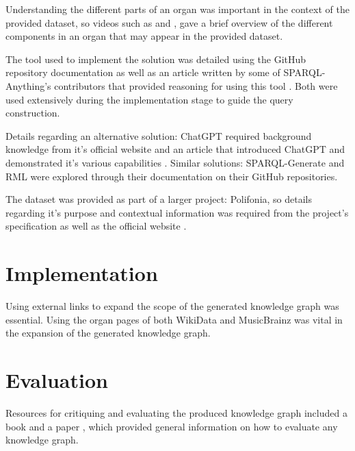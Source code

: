 Understanding the different parts of an organ was important in the context of the provided dataset, so videos such as \cite{organvideo} and \cite{organvideo1}, gave a brief overview of the different components in an organ that may appear in the provided dataset. 

The tool used to implement the solution was detailed using the GitHub repository documentation \cite{sparqlanythinggithub} as well as an article written by some of SPARQL-Anything's contributors that provided reasoning for using this tool \cite{sparqlanything}. Both were used extensively during the implementation stage to guide the query construction. 

Details regarding an alternative solution: ChatGPT required background knowledge from it's official website \cite{chatgptwebsite} and an article that introduced ChatGPT and demonstrated it's various capabilities \cite{chatgpt}. Similar solutions: SPARQL-Generate \cite{sparqlgenerate} and RML \cite{rml} were explored through their documentation on their GitHub repositories.

The dataset was provided as part of a larger project: Polifonia, so details regarding it's purpose and contextual information was required from the project's specification \cite{polifoniaproject} as well as the official website \cite{polifonia}. 

\section{Implementation}
\hspace{0.5cm} Using external links to expand the scope of the generated knowledge graph was essential. Using the organ pages of both WikiData \cite{organwikidata} and MusicBrainz \cite{organmusicbrainz} was vital in the expansion of the generated knowledge graph. 

\section{Evaluation}
\hspace{0.5cm} Resources for critiquing and evaluating the produced knowledge graph included a book \cite{knowledgegraphevaulationbook} and a paper \cite{evaluationpaper}, which provided general information on how to evaluate any knowledge graph. 
